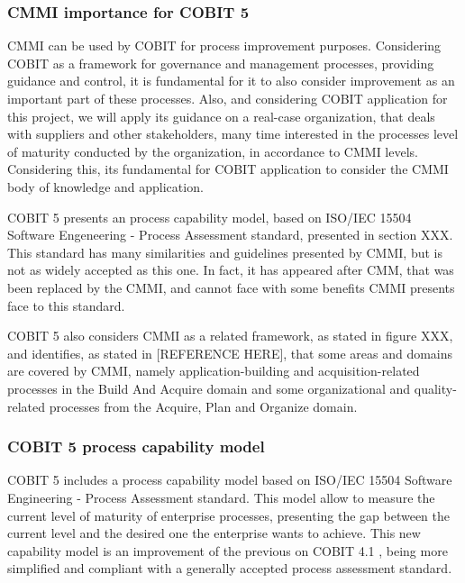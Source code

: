 \subsubsection{CMMI importance for COBIT 5}

CMMI can be used by COBIT for process improvement purposes. Considering COBIT as a framework for governance and management processes, providing guidance and control, it is fundamental for it to also consider improvement as an important part of these processes. Also, and considering COBIT application for this project, we will apply its guidance on a real-case organization, that deals with suppliers and other stakeholders, many time interested in the processes level of maturity conducted by the organization, in accordance to CMMI levels. Considering this, its fundamental for COBIT application to consider the CMMI body of knowledge and application.\par
COBIT 5 presents an process capability model, based on ISO/IEC 15504 Software Engeneering - Process Assessment standard, presented in section XXX. This standard has many similarities and guidelines presented by CMMI, but is not as widely accepted as this one. In fact, it has appeared after CMM, that was been replaced by the CMMI, and cannot face with some benefits CMMI presents face to this standard.\par
COBIT 5 also considers CMMI as a related framework, as stated in figure XXX, and identifies, as stated in [REFERENCE HERE], that some areas and domains are covered by CMMI, namely application-building and acquisition-related processes in the Build And Acquire domain and some organizational and quality-related processes from the Acquire, Plan and Organize domain.\par


\subsubsection{COBIT 5 process capability model}

COBIT 5 includes a process capability model based on ISO/IEC 15504 Software Engineering - Process Assessment standard.\cite{ISO15504} This model allow to measure the current level of maturity of enterprise processes, presenting the gap between the current level and the desired one the enterprise wants to achieve. This new capability model is an improvement of the previous on COBIT 4.1 \cite{cobit4}, being more simplified and compliant with a generally accepted process assessment standard.\par


